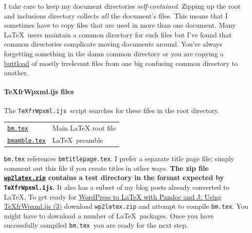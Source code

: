 I take care to keep my document directories \emph{self-contained}.
Zipping up the root and inclusions directory collects \emph{all} the
document's files. This means that I sometimes have to copy files that
are used in more than one document. Many \LaTeX\ users maintain a common
directory for such files but I've found that common directories
complicate moving documents around. You're always forgetting something
in the damn common directory or you are copying a
\href{http://www.urbandictionary.com/define.php?term=buttload}{buttload}
of mostly irrelevant files from one big confusing common directory to
another.

\paragraph{TeXfrWpxml.ijs files}

The \texttt{TeXfrWpxml.ijs~}script searches for these files in the root
directory.

\begin{center}
\begin{tabular}{lp{}} 
   \href{https://github.com/bakerjd99/Analyze-the-Data-not-the-Drivel/blob/master/wp2latex/bm.tex}{\texttt{bm.tex}}            & Main LaTeX root file  \\ 
   \href{https://github.com/bakerjd99/Analyze-the-Data-not-the-Drivel/blob/master/wp2latex/bmamble.tex}{\texttt{bmamble.tex}}  & \LaTeX\ preamble      \\ 
\end{tabular}
\end{center}

\noindent\texttt{bm.tex} references \texttt{bmtitlepage.tex}. I prefer a separate
title page file; simply comment out this file if you create titles in
other ways. \textbf{The zip file
\href{https://github.com/bakerjd99/jacks/blob/master/texfrwpxml/wp2latex.zip}{\texttt{wp2latex.zip}}
contains a test directory in the format expected by
\texttt{TeXfrWpxml.ijs}.} It also has a subset of my blog posts already
converted to \LaTeX. To get ready for
\href{https://bakerjd99.wordpress.com/2012/02/25/wordpress-to-latex-with-pandoc-and-j-using-texfrwpxml-ijs-part-3/}{WordPress
to LaTeX with Pandoc and J: Using TeXfrWpxml.ijs (3)} download
\texttt{wp2latex.zip} and attempt to compile \texttt{bm.tex}. You might
have to download a number of \LaTeX\ packages. Once you have successfully
compiled \texttt{bm.tex~}you are ready for the next step.




%